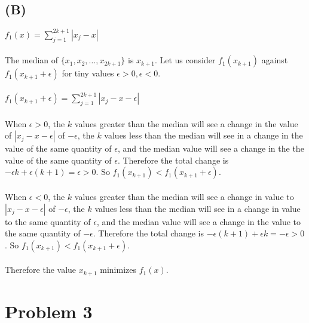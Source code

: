 \documentclass[12pt]{article}
\begin{document}
\subsection*{(B)}
$f_1(x) = \sum_{j=1}^{2k+1}|x_j-x|$ \\
\\
The median of $\{x_1, x_2, \dots, x_{2k+1}\}$ is $x_{k+1}$. Let us consider $f_1(x_{k+1})$ against $f_1(x_{k+1}+\epsilon)$ for tiny values $\epsilon > 0, \epsilon < 0$. \\
\\
$f_1(x_{k+1} + \epsilon) = \sum_{j=1}^{2k+1}|x_j-x-\epsilon|$ \\
\\
When $\epsilon > 0$, the $k$ values greater than the median will see a change in the value of $|x_j-x-\epsilon|$ of $-\epsilon$, the $k$ values less than the median will see in a change in the value of the same quantity of $\epsilon$, and the median value will see a change in the the value of the same quantity of $\epsilon$. Therefore the total change is $-\epsilon k + \epsilon (k+1) = \epsilon > 0$. So $f_1(x_{k+1}) < f_1(x_{k+1}+\epsilon)$. \\
\\
When $\epsilon < 0$, the $k$ values greater than the median will see a change in value to $|x_j-x-\epsilon|$ of $-\epsilon$, the $k$ values less than the median will see in a change in value to the same quantity of $\epsilon$, and the median value will see a change in the value to the same quantity of $-\epsilon$. Therefore the total change is $-\epsilon (k+1) + \epsilon k = -\epsilon > 0$. So $f_1(x_{k+1}) < f_1(x_{k+1}+\epsilon)$. \\
\\
Therefore the value $x_{k+1}$ minimizes $f_1(x)$.

\newpage
\section*{Problem 3}
\end{document}
